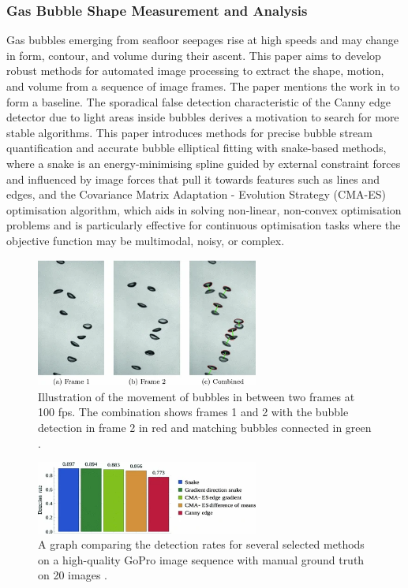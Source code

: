 \subsubsection{Gas Bubble Shape Measurement and Analysis \cite{zelenkaGasBubbleShape2014}}
Gas bubbles emerging from seafloor seepages rise at high speeds and may change in form, contour, and volume during their ascent. This paper aims to develop robust methods for automated image processing to extract the shape, motion, and volume from a sequence of image frames. The paper mentions the work in \cite{thomanekAutomatedGasBubble2010} to form a baseline. The sporadical false detection characteristic of the Canny edge detector due to light areas inside bubbles derives a motivation to search for more stable algorithms. This paper introduces methods for precise bubble stream quantification and accurate bubble elliptical fitting with snake-based methods, where a snake is an energy-minimising spline guided by external constraint forces and influenced by image forces that pull it towards features such as lines and edges, and the Covariance Matrix Adaptation - Evolution Strategy (CMA-ES) optimisation algorithm, which aids in solving non-linear, non-convex optimisation problems and is particularly effective for continuous optimisation tasks where the objective function may be multimodal, noisy, or complex.

\begin{figure}[h]
    \centering
    \includegraphics[width=0.65\textwidth]{assets/zelenkaGasBubbleShape2014-movement_tracking.png}
    \caption{Illustration of the movement of bubbles in between two frames at 100 fps. The combination shows frames 1 and 2 with the bubble detection in frame 2 in red and matching bubbles connected in green \cite{zelenkaGasBubbleShape2014}.}
    \label{fig:zelenka_tracking}
\end{figure}

\begin{figure}[h]
    \centering
    \includegraphics[width=0.65\textwidth]{assets/zelenkaGasBubbleShape2014-bubble-detection-methods-comparison.png}
    \caption{A graph comparing the detection rates for several selected methods on a high-quality GoPro image sequence with manual ground truth on 20 images \cite{zelenkaGasBubbleShape2014}.}
    \label{fig:zelenka_compare}
\end{figure}

